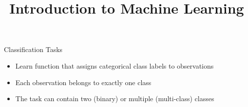 \documentclass[11pt,compress,t,notes=noshow, xcolor=table]{beamer}
\title{Introduction to Machine Learning}
\date{}
\begin{document}
\sloppy

\begin{vbframe}{Classification Tasks}
\begin{itemize}
\item \small Learn function that assigns categorical class labels to observations
\item \small Each observation belongs to exactly one class
\item \small The task can contain two (binary) or multiple (multi-class) classes
\end{itemize}



\end{vbframe}
\end{document}
